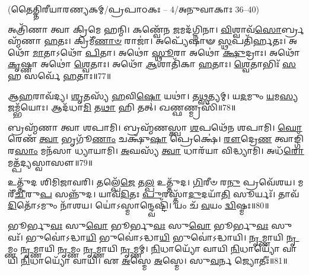 \vspace{-1ex}
\centerline{\scriptsize (𑌤𑍈𑌤𑍍𑌤𑌿𑌰𑍀𑌯𑌾𑌰𑌣𑍍𑌯𑌕𑌮𑍍/𑌪𑍍𑌰𑌪𑌾𑌠𑌕𑌃 – 4/𑌅𑌨𑍁𑌵𑌾𑌕𑌾𑌃 36--40)}

𑌅𑌤𑍍𑌰𑌿᳴𑌣𑌾 𑌤𑍍𑌵𑌾 𑌕𑍍𑌰𑌿𑌮𑍇 𑌹𑌨𑍍𑌮𑌿। 
𑌕𑌣𑍍𑌵𑍇᳴𑌨 \ul{𑌜}\-𑌮𑌦᳴𑌗𑍍𑌨𑌿𑌨𑌾। 
\-\ul{𑌵𑌿}\-𑌶𑍍𑌵𑌾𑌵᳴\-\ul{𑌸𑍋}\-𑌰𑍍𑌬𑍍𑌰𑌹𑍍𑌮᳴𑌣𑌾 \ul{𑌹}\-𑌤𑌃। 
𑌕𑍍𑌰𑌿𑌮𑍀᳴\-\ul{𑌣𑌾}\-\-\ul{𑍞} 𑌰𑌾𑌜𑌾॑। 
𑌅𑌪𑍍𑌯𑍇᳴𑌷𑌾𑍟 \ul{𑌸𑍍𑌥}\-𑌪𑌤𑌿᳴𑌰𑍍\mbox{}\-\ul{𑌹}\-𑌤𑌃। 
𑌅𑌥𑍋᳴ \ul{𑌮𑌾}\-𑌤𑌾𑌽𑌥𑍋᳴ \ul{𑌪𑌿}\-𑌤𑌾। 
𑌅𑌥𑍋॑ \ul{𑌸𑍍𑌥𑍂}\-𑌰𑌾 𑌅𑌥𑍋॑ \ul{𑌕𑍍𑌷𑍁}\-𑌦𑍍𑌰𑌾𑌃। 
𑌅𑌥𑍋᳴ \ul{𑌕𑍃}\-𑌷𑍍𑌣𑌾 𑌅𑌥𑍋॑ \ul{𑌶𑍍𑌵𑍇}\-𑌤𑌾𑌃। 
𑌅𑌥𑍋᳴ \ul{𑌆}\-𑌶𑌾𑌤𑌿᳴𑌕𑌾 \ul{𑌹}\-𑌤𑌾𑌃। 
\-\ul{𑌶𑍍𑌵𑍇}\-𑌤𑌾𑌭𑌿𑌃᳴ \ul{𑌸}\-𑌹 𑌸𑌰𑍍𑌵𑍇᳴ \ul{𑌹}\-𑌤𑌾𑌃॥77॥



𑌆\-\ul{𑌹}\-𑌰𑌾𑌵᳴𑌦𑍍𑌯। 
\-\ul{𑌶𑍃}\-𑌤𑌸𑍍𑌯᳴ \ul{𑌹}\-𑌵𑌿\-\ul{𑌷𑍋} 𑌯𑌥𑌾॑। 
𑌤\-\ul{𑌥𑍍𑌸}\-𑌤𑍍𑌯𑌮𑍍। 
𑌯\-\ul{𑌦}\-𑌮𑍁𑌂 \ul{𑌯}\-𑌮\-\ul{𑌸𑍍𑌯} 𑌜𑌮𑍍𑌭᳴𑌯𑍋𑌃। 
𑌆𑌦᳴𑌧𑌾\-\ul{𑌮𑌿} 𑌤\-\ul{𑌥𑌾} 𑌹𑌿 𑌤𑌤𑍍। 
𑌖𑌣𑍍𑌫𑌣𑍍𑌮𑍍𑌰𑌸𑌿᳴॥78॥



𑌬𑍍𑌰𑌹𑍍𑌮᳴𑌣𑌾 𑌤𑍍𑌵𑌾 𑌶𑌪𑌾𑌮𑌿। 
𑌬𑍍𑌰𑌹𑍍𑌮᳴𑌣𑌸𑍍𑌤𑍍𑌵𑌾 \ul{𑌶}\-𑌪𑌥𑍇᳴𑌨 𑌶𑌪𑌾𑌮𑌿। 
\-\ul{𑌘𑍋}\-𑌰𑍇𑌣᳴ \ul{𑌤𑍍𑌵𑌾} 𑌭𑍃𑌗𑍂᳴\-\ul{𑌣𑌾𑌂} 𑌚𑌕𑍍𑌷𑍁᳴\-\ul{𑌷𑌾} 𑌪𑍍𑌰𑍇𑌕𑍍𑌷𑍇॑। 
\-\ul{𑌰𑍗}\-𑌦𑍍𑌰𑍇\-\ul{𑌣} 𑌤𑍍𑌵𑌾𑌙𑍍𑌗𑌿᳴𑌰\-\ul{𑌸𑌾𑌂} 𑌮𑌨᳴𑌸𑌾 𑌧𑍍𑌯𑌾𑌯𑌾𑌮𑌿। 
\-\ul{𑌅}\-𑌘𑌸𑍍𑌯᳴ \ul{𑌤𑍍𑌵𑌾} 𑌧𑌾𑌰᳴𑌯𑌾 𑌵𑌿𑌦𑍍𑌧𑍍𑌯𑌾𑌮𑌿। 
𑌅𑌧᳴\-\ul{𑌰𑍋} 𑌮𑌤𑍍𑌪᳴𑌦𑍍𑌯𑌸𑍍𑌵𑌾𑌸𑍗॥79॥%



𑌉𑌤𑍍𑌤𑍁᳴𑌦 𑌶𑌿𑌮𑌿𑌜𑌾𑌵𑌰𑌿। 
𑌤𑌲𑍍𑌪𑍇᳴\-\ul{𑌜𑍇} 𑌤\-\ul{𑌲𑍍𑌪} 𑌉𑌤𑍍𑌤𑍁᳴𑌦। 
\-\ul{𑌗𑌿}\-𑌰𑍀𑍞 𑌰\-\ul{𑌨𑍁} 𑌪𑍍𑌰𑌵𑍇᳴𑌶𑌯। 
𑌮𑌰𑍀᳴\-\ul{𑌚𑍀}\-𑌰𑍁\-\ul{𑌪} 𑌸𑌨𑍍𑌨𑍁᳴𑌦। 
𑌯𑌾𑌵᳴\-\ul{𑌦𑌿}\-𑌤𑌃 \ul{𑌪𑍁}\-𑌰𑌸𑍍𑌤𑌾᳴\-\ul{𑌦𑍁}\-𑌦𑌯𑌾᳴\-\ul{𑌤𑌿} 𑌸𑍂𑌰𑍍𑌯𑌃᳴। 
𑌤𑌾𑌵᳴\-\ul{𑌦𑌿}\-𑌤𑍋᳴𑌽𑌮𑍁𑌂 𑌨𑌾᳴𑌶𑌯। 
𑌯𑍋॑𑌽𑌸𑍍𑌮𑌾𑌨𑍍𑌦𑍍𑌵𑍇𑌷𑍍𑌟𑌿᳴। 
𑌯𑌂 𑌚᳴ \ul{𑌵}\-𑌯𑌂 \ul{𑌦𑍍𑌵𑌿}\-𑌷𑍍𑌮𑌃॥80॥



𑌭𑍂𑌰𑍍𑌭𑍁\-\ul{𑌵𑌃} 𑌸𑍁\-\ul{𑌵𑍋} 𑌭𑍂𑌰𑍍𑌭𑍁\-\ul{𑌵𑌃} 𑌸𑍁\-\ul{𑌵𑍋} 𑌭𑍂𑌰𑍍𑌭𑍁\-\ul{𑌵𑌃} 𑌸𑍁𑌵𑌃᳴। 
𑌭𑍁𑌵𑍋॑𑌽𑌦𑍍𑌧𑌾\-\ul{𑌯𑌿} 𑌭𑍁𑌵𑍋॑𑌽𑌦𑍍𑌧𑌾\-\ul{𑌯𑌿} 𑌭𑍁𑌵𑍋॑𑌽𑌦𑍍𑌧𑌾𑌯𑌿। 
\-\ul{𑌨𑍃}\-𑌮𑍍𑌣𑌾𑌯𑌿 \ul{𑌨𑍃}\-𑌮𑍍𑌣𑌂 \ul{𑌨𑍃}\-𑌮𑍍𑌣𑌾𑌯𑌿 \ul{𑌨𑍃}\-𑌮𑍍𑌣𑌂 \ul{𑌨𑍃}\-𑌮𑍍𑌣𑌾𑌯𑌿 \ul{𑌨𑍃}\-𑌮𑍍𑌣𑌮𑍍। 
\-\ul{𑌨𑌿}\-𑌧𑌾𑌯𑍍𑌯𑍋᳴ 𑌵𑌾𑌯𑌿 \ul{𑌨𑌿}\-𑌧𑌾𑌯𑍍𑌯𑍋᳴ 𑌵𑌾𑌯𑌿 \ul{𑌨𑌿}\-𑌧𑌾𑌯𑍍𑌯𑍋᳴ 𑌵𑌾𑌯𑌿। 
𑌏 \ul{𑌅}\-𑌸𑍍𑌮𑍇 \ul{𑌅}\-𑌸𑍍𑌮𑍇। 
𑌸𑍁\-\ul{𑌵}\-𑌰𑍍𑌨 𑌜𑍍𑌯𑍋𑌤𑍀𑌃॑॥81॥

\closesection

